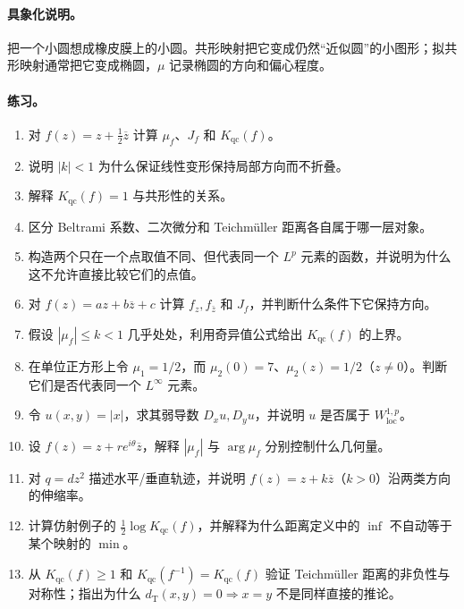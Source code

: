 \documentclass[UTF8,fontset=none,a4paper,11pt]{ctexart}
\theoremstyle{foundation-definition}
\theoremstyle{foundation-theorem}
\theoremstyle{foundation-proposition}
\theoremstyle{foundation-example}
\theoremstyle{foundation-remark}
\theoremstyle{foundation-theorem}
\begin{document}
\paragraph{具象化说明。}
把一个小圆想成橡皮膜上的小圆。共形映射把它变成仍然“近似圆”的小图形；拟共形映射通常把它变成椭圆，\(\mu\) 记录椭圆的方向和偏心程度。

\paragraph{练习。}
\begin{enumerate}[label=M9.\arabic*.]
  \item 对 \(f(z)=z+\frac12\overline z\) 计算 \(\mu_f\)、\(J_f\) 和 \(K_{\mathrm{qc}}(f)\)。
  \item 说明 \(|k|<1\) 为什么保证线性变形保持局部方向而不折叠。
  \item 解释 \(K_{\mathrm{qc}}(f)=1\) 与共形性的关系。
  \item 区分 Beltrami 系数、二次微分和 Teichmüller 距离各自属于哪一层对象。
  \item 构造两个只在一个点取值不同、但代表同一个 \(L^p\) 元素的函数，并说明为什么这不允许直接比较它们的点值。
  \item 对 \(f(z)=az+b\overline z+c\) 计算 \(f_z,f_{\bar z}\) 和 \(J_f\)，并判断什么条件下它保持方向。
  \item 假设 \(|\mu_f|\leq k<1\) 几乎处处，利用奇异值公式给出 \(K_{\mathrm{qc}}(f)\) 的上界。
  \item 在单位正方形上令 \(\mu_1=1/2\)，而 \(\mu_2(0)=7\)、\(\mu_2(z)=1/2\)（\(z\neq0\)）。判断它们是否代表同一个 \(L^\infty\) 元素。
  \item 令 \(u(x,y)=|x|\)，求其弱导数 \(D_xu,D_yu\)，并说明 \(u\) 是否属于 \(W^{1,p}_{\mathrm{loc}}\)。
  \item 设 \(f(z)=z+re^{i\theta}\overline z\)，解释 \(|\mu_f|\) 与 \(\arg\mu_f\) 分别控制什么几何量。
  \item 对 \(q=dz^2\) 描述水平/垂直轨迹，并说明 \(f(z)=z+k\overline z\)（\(k>0\)）沿两类方向的伸缩率。
  \item 计算仿射例子的 \(\frac12\log K_{\mathrm{qc}}(f)\)，并解释为什么距离定义中的 \(\inf\) 不自动等于某个映射的 \(\min\)。
  \item 从 \(K_{\mathrm{qc}}(f)\geq1\) 和 \(K_{\mathrm{qc}}(f^{-1})=K_{\mathrm{qc}}(f)\) 验证 Teichmüller 距离的非负性与对称性；指出为什么 \(d_{\mathrm T}(x,y)=0\Rightarrow x=y\) 不是同样直接的推论。
\end{enumerate}
\end{document}
